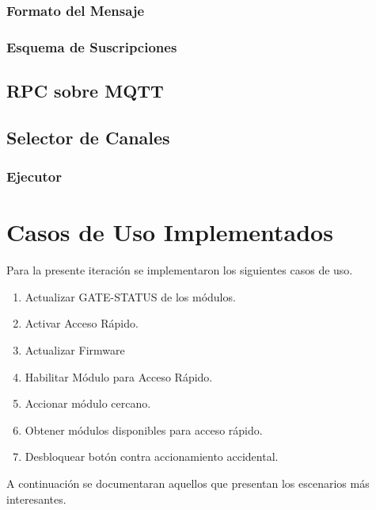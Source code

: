 \subsubsection{Formato del Mensaje}

\subsubsection{Esquema de Suscripciones}

\subsection{RPC sobre MQTT}

\subsection{Selector de Canales}

\subsubsection{Ejecutor}


\section{Casos de Uso Implementados}
Para la presente iteración se implementaron los siguientes casos de uso.
\begin{enumerate}
	\item Actualizar GATE-STATUS de los módulos.
	\item Activar Acceso Rápido.
	\item Actualizar Firmware
	\item Habilitar Módulo para Acceso Rápido.
	\item Accionar módulo cercano.
	\item Obtener módulos disponibles para acceso rápido.
	\item Desbloquear botón contra accionamiento accidental.
\end{enumerate}

A continuación se documentaran aquellos que presentan los escenarios más interesantes.

